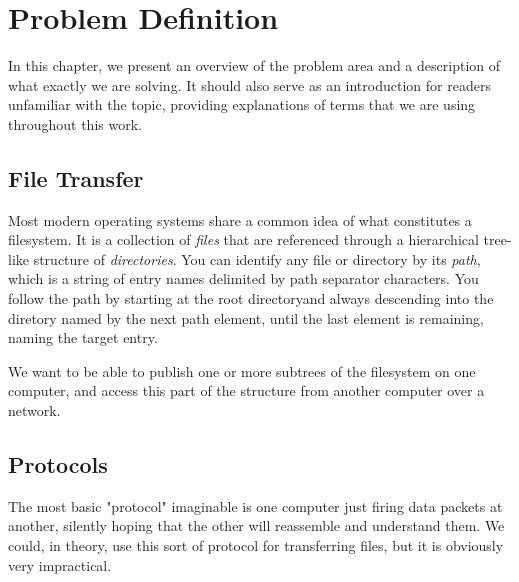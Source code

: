 
\chapter{Problem Definition}

In this chapter, we present an overview of the problem area and a description of what exactly we are solving.
It should also serve as an introduction for readers unfamiliar with the topic, providing explanations of terms
that we are using throughout this work.

\section{File Transfer}

Most modern operating systems share a common idea of what constitutes a filesystem. It is a collection of {\it
files} that are referenced through a hierarchical tree-like structure of {\it directories}. You can identify
any file or directory by its {\it path}, which is a string of entry names delimited by path separator
characters\footnotemark[1].  You follow the path by starting at the root directory\footnotemark[2] and always
descending into the diretory named by the next path element, until the last element is remaining, naming the
target entry.

We want to be able to publish one or more subtrees of the filesystem on one computer, and access this part of
the structure from another computer over a network.

\section{Protocols}

The most basic "protocol" imaginable is one computer just firing data packets at another, silently hoping that
the other will reassemble and understand them. We could, in theory, use this sort of protocol for transferring
files, but it is obviously very impractical.




